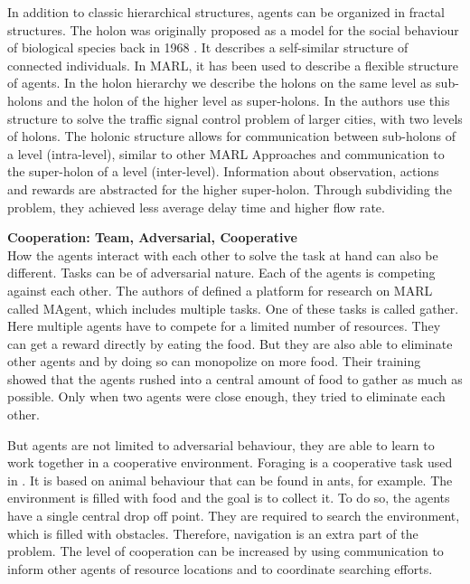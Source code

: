 In addition to classic hierarchical structures, agents can be organized in fractal structures. The holon was originally proposed as a model for the social behaviour of biological species back in 1968 \citep{koestler1968ghost}. It describes a self-similar structure of connected individuals. In MARL, it has been used to describe a flexible structure of agents. In the holon hierarchy we describe the holons on the same level as sub-holons and the holon of the higher level as super-holons. In \citet{Holonic2013} the authors use this structure to solve the traffic signal control problem of larger cities, with two levels of holons. The holonic structure allows for communication between sub-holons of a level (intra-level), similar to other MARL Approaches and communication to the super-holon of a level (inter-level). Information about observation, actions and rewards are abstracted for the higher super-holon. Through subdividing the problem, they achieved less average delay time and higher flow rate.

\textbf{Cooperation: Team, Adversarial, Cooperative} \\
How the agents interact with each other to solve the task at hand can also be different. Tasks can be of adversarial nature. Each of the agents is competing against each other. The authors of \citet{MAgent2018} defined a platform for research on MARL called MAgent, which includes multiple tasks. One of these tasks is called gather. Here multiple agents have to compete for a limited number of resources. They can get a reward directly by eating the food. But they are also able to eliminate other agents and by doing so can monopolize on more food. Their training showed that the agents rushed into a central amount of food to gather as much as possible. Only when two agents were close enough, they tried to eliminate each other.\par

But agents are not limited to adversarial behaviour, they are able to learn to work together in a cooperative environment. Foraging is a cooperative task used in \citet{Foraging2013}. It is based on animal behaviour that can be found in ants, for example. The environment is filled with food and the goal is to collect it. To do so, the agents have a single central drop off point. They are required to search the environment, which is filled with obstacles. Therefore, navigation is an extra part of the problem. The level of cooperation can be increased by using communication to inform other agents of resource locations and to coordinate searching efforts. \par

